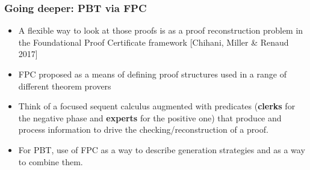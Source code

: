 \documentclass{beamer}
\newcommand{\red}[1]{{\color{red} #1}}
\newenvironment{myslide}[1]
    {\begin{frame}\frametitle{#1}}
    {\end{frame}}
\begin{document}
\begin{myslide}{Going deeper: PBT via FPC}
  \begin{itemize}
  \item A flexible  way to look at those proofs is as a
    \red{proof reconstruction} problem in the \red{Foundational Proof
      Certificate} framework [Chihani, Miller \& Renaud 2017]
\item FPC proposed as a means of defining proof
structures used in a range of different theorem provers
\item Think of a focused sequent calculus
  augmented with predicates (\textbf{clerks} for the negative phase and \textbf{experts}
  for the positive one) that produce and process information to drive
  the checking/reconstruction of a proof.
\item For PBT, use of FPC as a way to
describe \red{generation strategies} and as a way to combine them.
  \end{itemize}
  
\end{myslide}
\newcommand{\andd}{\wedge}
\newcommand{\impp}{\supset}
\end{document}
